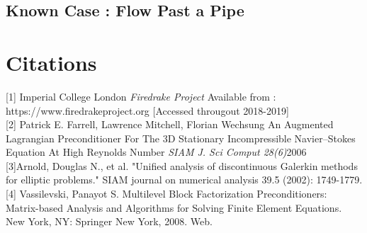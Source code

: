 \documentclass[11pt,twoside,a4paper]{article}
\begin{document}
\subsection{Known Case : Flow Past a Pipe}
\section{Citations}

[1] Imperial College London \textit{Firedrake Project} Available from : https://www.firedrakeproject.org [Accessed througout 2018-2019]\\

[2] Patrick E. Farrell, Lawrence Mitchell, Florian Wechsung
 An Augmented Lagrangian Preconditioner For The 3D Stationary Incompressible Navier–Stokes Equation At High Reynolds Number
\textit{SIAM J. Sci Comput 28(6)}2006\\

[3]Arnold, Douglas N., et al. "Unified analysis of discontinuous Galerkin methods for elliptic problems." SIAM journal on numerical analysis 39.5 (2002): 1749-1779.\\

[4] Vassilevski, Panayot S. Multilevel Block Factorization Preconditioners: Matrix-based Analysis and Algorithms for Solving Finite Element Equations. New York, NY: Springer New York, 2008. Web.
\end{document}
